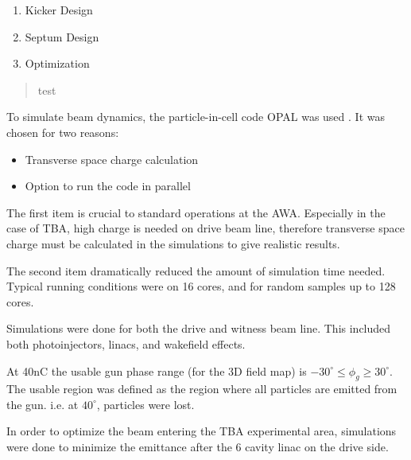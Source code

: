 \documentclass{iitthesis}
\begin{document}
\begin{enumerate}
	\item Kicker Design
	\item Septum Design
	\item Optimization 
\end{enumerate}

\begin{quotation}
	test
\end{quotation}

\clearpage


\label{sec:code}

To simulate beam dynamics, the particle-in-cell code OPAL was used \cite{opal}. 
It was chosen for two reasons:
\begin{itemize}
	\item Transverse space charge calculation 
	\item Option to run the code in parallel
\end{itemize} 

The first item is crucial to standard operations at the AWA. Especially in the 
case of TBA, high charge is needed on drive beam line, therefore transverse 
space charge must be calculated in the simulations to give realistic results.

The second item dramatically reduced the amount of simulation time needed. 
Typical running conditions were on 16 cores, and for random samples up to 128 cores.

 \label{sec:opt}

 \label{sec:simulations}
Simulations were done for both the drive and witness beam line. 
This included both photoinjectors, linacs, and wakefield effects. 

At 40nC the usable gun phase range (for the 3D field map) is 
$-30^\circ \le \phi_g \ge 30^\circ$. The usable region was defined 
as the region where all particles are emitted from the gun. 
i.e. at $40^\circ$, particles were lost.  

 \label{sec:pareto}
In order to optimize the beam entering the TBA experimental area, 
simulations were done to minimize the emittance after the 6 cavity linac
on the drive side. 
\end{document}

